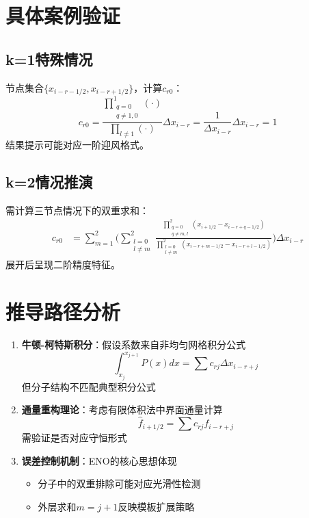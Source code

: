 \documentclass{ctexart}
\begin{document}
\section{具体案例验证}
\subsection{k=1特殊情况}
节点集合$\{x_{i-r-1/2}, x_{i-r+1/2}\}$，计算$c_{r0}$：
\[
c_{r0} = \frac{\prod_{\substack{q=0 \\ q \neq 1,0}}^{1} (\cdot)}{\prod_{l\neq1} (\cdot)} \Delta x_{i-r} = \frac{1}{\Delta x_{i-r}} \Delta x_{i-r} = 1
\]
结果提示可能对应一阶迎风格式。

\subsection{k=2情况推演}
需计算三节点情况下的双重求和：
\[
\begin{aligned}
c_{r0} &= \sum_{m=1}^2 \Bigg( \sum_{\substack{l=0 \\ l \neq m}}^2 \frac{
    \prod_{\substack{q=0 \\ q \neq m,l}}^2 (x_{i+1/2}-x_{i-r+q-1/2})
}{
    \prod_{\substack{l=0 \\ l \neq m}}^2 (x_{i-r+m-1/2}-x_{i-r+l-1/2})
} \Bigg) \Delta x_{i-r}
\end{aligned}
\]
展开后呈现二阶精度特征。

\section{推导路径分析}
\begin{enumerate}[label=路径\arabic*:]
    \item \textbf{牛顿-柯特斯积分}：假设系数来自非均匀网格积分公式
    \[
    \int_{x_j}^{x_{j+1}} P(x)dx = \sum c_{rj} \Delta x_{i-r+j}
    \]
    但分子结构不匹配典型积分公式
    
    \item \textbf{通量重构理论}：考虑有限体积法中界面通量计算
    \[
    \hat{f}_{i+1/2} = \sum c_{rj} f_{i-r+j}
    \]
    需验证是否对应守恒形式
    
    \item \textbf{误差控制机制}：ENO的核心思想体现
    \begin{itemize}
        \item 分子中的双重排除可能对应光滑性检测
        \item 外层求和$m=j+1$反映模板扩展策略
    \end{itemize}
\end{enumerate}
\end{document}
